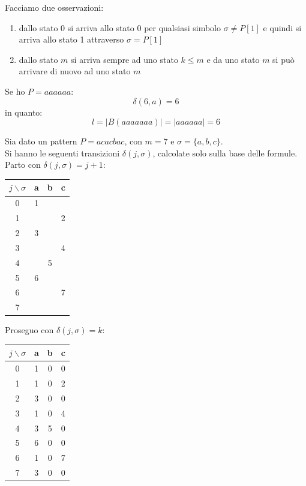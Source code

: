 \documentclass[a4paper,12pt, oneside]{book}
\begin{document}
Facciamo due osservazioni:
\begin{enumerate}
  \item dallo stato 0 si arriva allo stato 0 per qualsiasi simbolo $\sigma\neq
  P[1]$ e quindi si arriva allo stato 1 attraverso $\sigma =P[1]$
  \item dallo stato $m$ si arriva sempre ad uno stato $k\leq m$ e da uno stato
  $m$ si può arrivare di nuovo ad uno stato $m$
\end{enumerate}
\begin{esempio}
  Se ho $P=aaaaaa$:
  \[\delta(6,a)=6\]
  in quanto:
  \[l=|B(aaaaaaa)|=|aaaaaa|=6\]
\end{esempio}
\begin{esempio}
  Sia dato un pattern $P=acacbac$, con $m=7$ e $\sigma=\{a,b,c\}$.\\
  Si hanno le seguenti transizioni $\delta(j,\sigma)$, calcolate solo sulla base
  delle formule.\\
  Parto con $\delta(j,\sigma)=j+1$:
  \begin{table}[H]
    \centering
    \begin{tabular}[H]{c||c|c|c}
      $j\backslash\sigma$ & a & b & c\\
      \hline
      \hline
      0 & 1 & & \\
      1 & & & 2\\
      2 & 3 & & \\
      3 & & & 4\\
      4 & & 5 & \\ 
      5 & 6 & & \\
      6 & & & 7\\
      7 & & &       
    \end{tabular}
  \end{table}
  Proseguo con $\delta(j,\sigma)=k$:
  \begin{table}[H]
    \centering
    \begin{tabular}[H]{c||c|c|c}
      $j\backslash\sigma$ & a & b & c\\
      \hline
      \hline
      0 & 1 & 0 & 0\\
      1 & 1 & 0 & 2\\
      2 & 3 & 0 & 0\\
      3 & 1 & 0 & 4\\
      4 & 3 & 5 & 0\\ 
      5 & 6 & 0 & 0\\
      6 & 1 & 0 & 7\\
      7 & 3 & 0 & 0      
    \end{tabular}
  \end{table}
\end{esempio}
\end{document}
